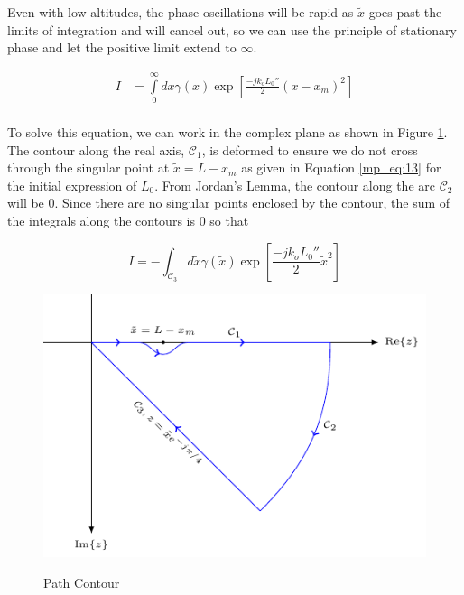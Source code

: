 Even with low altitudes, the phase oscillations will be rapid as $\tilde{x}$ goes past the limits of integration and will cancel out, so we can use the principle of stationary phase and let the positive limit extend to $\infty$.

\begin{equation}
\begin{aligned}
I&=\int\limits_{0}^{\infty}dx\gamma(x)\exp\left[\frac{-jk_oL_0''}{2}(x-x_m)^2\right]\\
\end{aligned}
\label{mp_eq:23}
\end{equation}

To solve this equation, we can work in the complex plane as shown in Figure \ref{mp_fig:6}. The contour along the real axis, $\mathcal{C}_1$, is deformed to ensure we do not cross through the singular point at $\tilde{x} = L-x_m$ as given in Equation \ref{mp_eq:13} for the initial expression of $L_0$. From Jordan's Lemma, the contour along the arc $\mathcal{C}_2$ will be $0$. Since there are no singular points enclosed by the contour, the sum of the integrals along the contours is $0$ so that

\begin{equation}
I = -\int_{\mathcal{C}_3}d\tilde{x} \gamma(\tilde{x})\exp\left[\frac{-jk_oL_0''}{2}\tilde{x}^2\right]
\label{mp_eq:24}
\end{equation}

\begin{figure}[H]
  \begin{center}
\includegraphics[width=5in]{../media/path_contour-figure1.pdf}
  \end{center}
  \renewcommand{\baselinestretch}{1} \small\normalsize
  \begin{quote}
    \caption[Path Contour]{ Path Contour\label{mp_fig:6}}
  \end{quote}
\end{figure}
\renewcommand{\baselinestretch}{2} \small\normalsize

